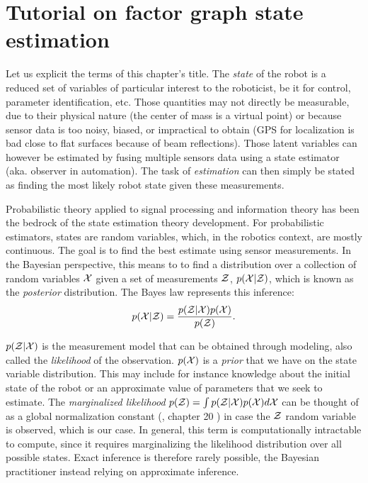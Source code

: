 \chapter{Tutorial on factor graph state estimation}
\minitoc

Let us explicit the terms of this chapter's title. The \textit{state} of the robot is a reduced set of variables of particular interest to the roboticist, be it for control, parameter identification, etc.
Those quantities may not directly be measurable, due to their physical nature (the center of mass is a virtual point) or because sensor data
is too noisy, biased, or impractical to obtain (\eg GPS for localization is bad close to flat surfaces because of beam reflections). 
Those latent variables can however be estimated by fusing multiple sensors data using a state estimator (aka. observer in automation). 
The task of \textit{estimation} can then simply be stated as finding the most likely robot state given these measurements. 

Probabilistic theory applied to signal processing and information theory has been the bedrock of the state estimation theory development.
For probabilistic estimators, states are random variables, which, in the robotics context, are mostly continuous.
The goal is to find the best estimate using sensor measurements.
In the Bayesian perspective, this means to to find a distribution over a collection of random variables $\mathcal{X}$ given a set 
of measurements $\mathcal{Z}$, $p(\mathcal{X} | \mathcal{Z})$, which is known as the \textit{posterior} distribution. 
The Bayes law represents this inference:
%
\begin{equation}
    p(\mathcal{X} | \mathcal{Z}) = \frac{p(\mathcal{Z} | \mathcal{X}) p(\mathcal{X})}{p(\mathcal{Z})}.
\end{equation}

$p(\mathcal{Z} | \mathcal{X})$ is the measurement model that can be obtained through modeling, also called the \textit{likelihood} of the observation. 
$p(\mathcal{X})$ is a \textit{prior} that we have on the state variable distribution. This may include for instance knowledge about the initial state of the robot or
an approximate value of parameters that we seek to estimate.
The \textit{marginalized likelihood} $p(\mathcal{Z}) = \int p(\mathcal{Z}|\mathcal{X})p(\mathcal{X})d\mathcal{X} $ can be thought of as a global normalization constant (\cite{koller2009probabilistic}, chapter 20 ) in case 
the $\mathcal{Z}$ random variable is observed, which is our case. In general, this term is computationally intractable to compute, since it requires marginalizing
the likelihood distribution over all possible states. Exact inference is therefore rarely possible, the Bayesian practitioner instead relying on approximate inference.

